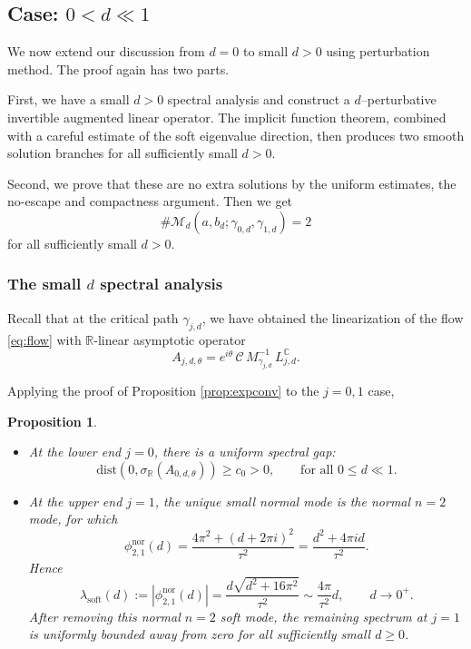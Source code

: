 \documentclass[11pt]{amsart}
\theoremstyle{plain}
\newtheorem{prop}[thm]{Proposition}
\theoremstyle{definition}
\newcommand{\R}{\mathbb{R}}
\newcommand{\C}{\mathbb{C}}
\begin{document}
\subsection{Case: $0<d\ll1$} 

We now extend our discussion from $d=0$ to small $d>0$ using perturbation method. The proof again has two parts. 

First, we have a small $d>0$ spectral analysis and construct a $d$--perturbative invertible augmented linear operator. The implicit function theorem, combined with a careful estimate of the soft eigenvalue direction, then produces two smooth solution branches for all sufficiently small $d>0$.

Second, we prove that these are no extra solutions by the uniform estimates, the no-escape and compactness argument. Then we get
\[
\#\mathcal M_d(a,b_d;\gamma_{0,d},\gamma_{1,d})=2
\]
for all sufficiently small $d>0$.



\subsubsection{The small $d$ spectral analysis}

Recall that at the critical path $\gamma_{j,d}$, we have obtained the linearization of the flow \eqref{eq:flow} with $\R$-linear asymptotic operator
\[
A_{j,d,\theta}=e^{i\theta}\,\mathcal{C}\,M_{\gamma_{j,d}}^{-1}\, L^{\C}_{j,d}.
\]

Applying the proof of Proposition \ref{prop:expconv} to the $j=0,1$ case, 
\begin{prop}\label{prop:exact-spectrum-small-d}
\begin{itemize}
    \item[(1)] At the lower end $j=0$, there is a uniform spectral gap:
\[
\mathrm{dist}(0,\sigma_{\R}(A_{0,d,\theta}))
\ge c_0>0,\qquad \text{for all } 0\le d\ll1.
\]
    \item[(2)] At the upper end $j=1$, the unique small normal mode is the normal
$n=2$ mode, for which
\[
\phi^{\mathrm{nor}}_{2,1}(d)
=\frac{4\pi^2+(d+2\pi i)^2}{\tau^2}
=\frac{d^2+4\pi i d}{\tau^2}.
\]
Hence
\[
\lambda_{\mathrm{soft}}(d)
:=|\phi^{\mathrm{nor}}_{2,1}(d)|
=\frac{d\sqrt{d^2+16\pi^2}}{\tau^2}
\sim\frac{4\pi}{\tau^2}d,\qquad d\to0^+.
\]
After removing this normal $n=2$ soft mode, the remaining spectrum at $j=1$ is uniformly bounded away from zero for all sufficiently small $d\ge0$.
\end{itemize}
\end{prop}
\end{document}
